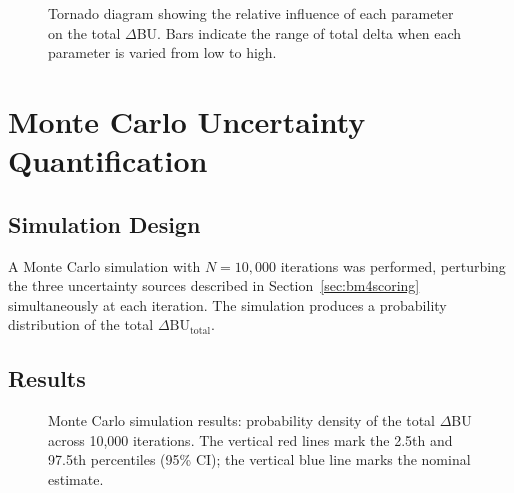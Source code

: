 \begin{figure}[H]
\centering
{}
\caption{Tornado diagram showing the relative influence of each parameter on the total $\Delta$BU. Bars indicate the range of total delta when each parameter is varied from low to high.}
\label{fig:tornado}
\end{figure}


\section{Monte Carlo Uncertainty Quantification}

\subsection{Simulation Design}

A Monte Carlo simulation with $N = 10{,}000$ iterations was performed, perturbing the three uncertainty sources described in Section~\ref{sec:bm4scoring} simultaneously at each iteration. The simulation produces a probability distribution of the total $\Delta\text{BU}_{\text{total}}$.

\subsection{Results}

\begin{figure}[H]
\centering
{}
\caption{Monte Carlo simulation results: probability density of the total $\Delta$BU across 10,000 iterations. The vertical red lines mark the 2.5th and 97.5th percentiles (95\% CI); the vertical blue line marks the nominal estimate.}
\label{fig:mc-distribution}
\end{figure}

